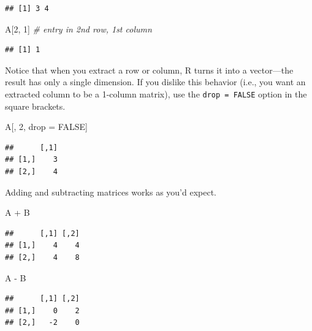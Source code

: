 \documentclass[
  12pt,
  oneside,openany]{book}
\newenvironment{Shaded}{\begin{snugshade}}{\end{snugshade}}
\newcommand{\CommentTok}[1]{\textcolor[rgb]{0.56,0.35,0.01}{\textit{#1}}}
\newcommand{\ConstantTok}[1]{\textcolor[rgb]{0.00,0.00,0.00}{#1}}
\newcommand{\DecValTok}[1]{\textcolor[rgb]{0.00,0.00,0.81}{#1}}
\newcommand{\NormalTok}[1]{#1}
\newcommand{\OtherTok}[1]{\textcolor[rgb]{0.56,0.35,0.01}{#1}}
\newcommand{\SpecialCharTok}[1]{\textcolor[rgb]{0.00,0.00,0.00}{#1}}
\begin{document}
\begin{verbatim}
## [1] 3 4
\end{verbatim}

\begin{Shaded}
\begin{Highlighting}[]
\NormalTok{A[}\DecValTok{2}\NormalTok{, }\DecValTok{1}\NormalTok{]  }\CommentTok{\# entry in 2nd row, 1st column}
\end{Highlighting}
\end{Shaded}

\begin{verbatim}
## [1] 1
\end{verbatim}

Notice that when you extract a row or column, R turns it into a vector---the result has only a single dimension. If you dislike this behavior (i.e., you want an extracted column to be a 1-column matrix), use the \texttt{drop\ =\ FALSE} option in the square brackets.

\begin{Shaded}
\begin{Highlighting}[]
\NormalTok{A[, }\DecValTok{2}\NormalTok{, drop }\OtherTok{=} \ConstantTok{FALSE}\NormalTok{]}
\end{Highlighting}
\end{Shaded}

\begin{verbatim}
##      [,1]
## [1,]    3
## [2,]    4
\end{verbatim}

Adding and subtracting matrices works as you'd expect.

\begin{Shaded}
\begin{Highlighting}[]
\NormalTok{A }\SpecialCharTok{+}\NormalTok{ B}
\end{Highlighting}
\end{Shaded}

\begin{verbatim}
##      [,1] [,2]
## [1,]    4    4
## [2,]    4    8
\end{verbatim}

\begin{Shaded}
\begin{Highlighting}[]
\NormalTok{A }\SpecialCharTok{{-}}\NormalTok{ B}
\end{Highlighting}
\end{Shaded}

\begin{verbatim}
##      [,1] [,2]
## [1,]    0    2
## [2,]   -2    0
\end{verbatim}
\end{document}
